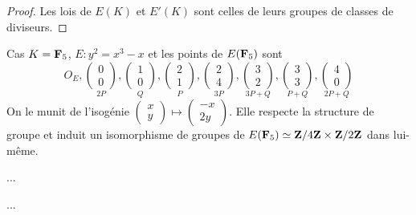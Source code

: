	\begin{proof}
		Les lois de $E(K)$ et $E'(K)$ sont celles de leurs groupes de classes de diviseurs.
	\end{proof}
	
	\begin{ex}
		Cas $K = \mathbf{F}_5$, $E : y^2 = x^3 - x$ et les points de $E(\mathbf{F}_5)$ sont
		$$O_E, \underset{2P}{\begin{pmatrix} 0 \\ 0 \end{pmatrix}},
		\underset{Q}{\begin{pmatrix} 1 \\ 0 \end{pmatrix}},
		\underset{P}{\begin{pmatrix} 2 \\ 1 \end{pmatrix}},
		\underset{3P}{\begin{pmatrix} 2 \\ 4 \end{pmatrix}},
		\underset{3P + Q}{\begin{pmatrix} 3 \\ 2 \end{pmatrix}},
		\underset{P + Q}{\begin{pmatrix} 3 \\ 3 \end{pmatrix}},
		\underset{2P + Q}{\begin{pmatrix} 4 \\ 0 \end{pmatrix}}$$
		On le munit de l'isogénie $\begin{pmatrix} x \\ y \end{pmatrix} \mapsto \begin{pmatrix} -x \\ 2y \end{pmatrix}$.
		Elle respecte la structure de groupe et induit un isomorphisme de groupes de $E(\mathbf{F}_5) \simeq \mathbf{Z} / 4\mathbf{Z} \times \mathbf{Z} / 2\mathbf{Z}$ dans lui-même.
	\end{ex}
	
	...%
	
	\begin{rem}
		...%
	\end{rem}